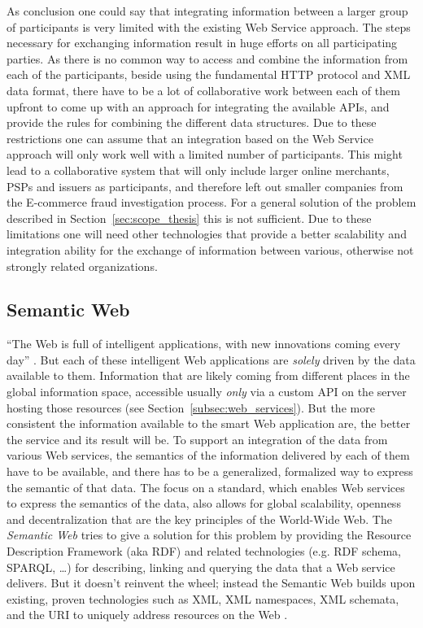 As conclusion one could say that integrating information between a larger group of participants is very limited with the existing Web Service approach. The steps necessary for exchanging information result in huge efforts on all participating parties. As there is no common way to access and combine the information from each of the participants, beside using the fundamental \gls{HTTP} protocol and \gls{XML} data format, there have to be a lot of collaborative work between each of them upfront to come up with an approach for integrating the available \gls{API}s, and provide the rules for combining the different data structures. Due to these restrictions one can assume that an integration based on the Web Service approach will only work well with a limited number of participants. This might lead to a collaborative system that will only include larger online merchants, \gls{PSP}s and issuers as participants, and therefore left out smaller companies from the \gls{E-commerce} fraud investigation process. For a general solution of the problem described in Section~\ref{sec:scope_thesis} this is not sufficient. Due to these limitations one will need other technologies that provide a better scalability and integration ability for the exchange of information between various, otherwise not strongly related organizations.


\subsection{Semantic Web}
\label{subsec:web_data}

``The Web is full of intelligent applications, with new innovations coming every day'' \citep{allemang2011semantic}. But each of these intelligent Web applications are \emph{solely} driven by the data available to them. Information that are likely coming from different places in the global information space, accessible usually \emph{only} via a custom \gls{API} on the server hosting those resources (see Section~\ref{subsec:web_services}). But the more consistent the information available to the smart Web application are, the better the service and its result will be. To support an integration of the data from various Web services, the semantics of the information delivered by each of them have to be available, and there has to be a generalized, formalized way to express the semantic of that data. The focus on a standard, which enables Web services to express the semantics of the data, also allows for global scalability, openness and decentralization that are the key principles of the World-Wide Web. The \emph{Semantic Web} tries to give a solution for this problem by providing the Resource Description Framework (aka \gls{RDF}) and related technologies (e.g. \gls{RDF} schema, \gls{SPARQL}, \ldots) for describing, linking and querying the data that a Web service delivers. But it doesn’t reinvent the wheel; instead the Semantic Web builds upon existing, proven technologies such as \gls{XML}, \gls{XML} namespaces, \gls{XML} schemata, and the \gls{URI} to uniquely address resources on the Web \citep{allemang2011semantic}. \\


